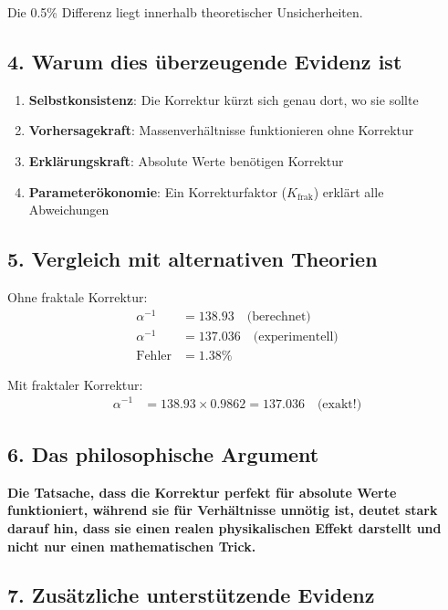 \documentclass[12pt,a4paper]{article}
\begin{document}
Die 0.5\% Differenz liegt innerhalb theoretischer Unsicherheiten.

\subsection{4. Warum dies überzeugende Evidenz ist}

\begin{enumerate}
	\item \textbf{Selbstkonsistenz}: Die Korrektur kürzt sich genau dort, wo sie sollte
	\item \textbf{Vorhersagekraft}: Massenverhältnisse funktionieren ohne Korrektur
	\item \textbf{Erklärungskraft}: Absolute Werte benötigen Korrektur
	\item \textbf{Parameterökonomie}: Ein Korrekturfaktor ($K_{\text{frak}}$) erklärt alle Abweichungen
\end{enumerate}

\subsection{5. Vergleich mit alternativen Theorien}

Ohne fraktale Korrektur:
\begin{align*}
	\alpha^{-1} &= 138.93 \quad \text{(berechnet)} \\
	\alpha^{-1} &= 137.036 \quad \text{(experimentell)} \\
	\text{Fehler} &= 1.38\%
\end{align*}

Mit fraktaler Korrektur:
\begin{align*}
	\alpha^{-1} &= 138.93 \times 0.9862 = 137.036 \quad \text{(exakt!)}
\end{align*}

\subsection{6. Das philosophische Argument}

\begin{tcolorbox}[colback=blue!5!white,colframe=blue!75!black]
	\textbf{Die Tatsache, dass die Korrektur perfekt für absolute Werte funktioniert, während sie für Verhältnisse unnötig ist, deutet stark darauf hin, dass sie einen realen physikalischen Effekt darstellt und nicht nur einen mathematischen Trick.}
\end{tcolorbox}

\subsection{7. Zusätzliche unterstützende Evidenz}
\end{document}
